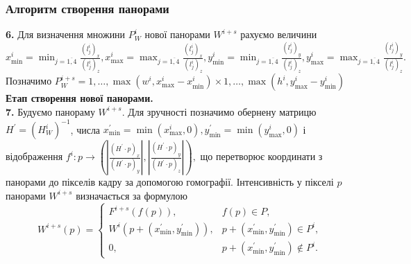 \begin{frame}
	\frametitle{Алгоритм створення панорами}
	\textbf{6.} Для визначення множини $P_{W}^{i}$ нової панорами $W^{i + s}$
	рахуємо величини
	$x_{\min}^{i}= \min_{j = \overline{1,4}}\frac{( l_{j}^{i})_{x}}{( l_{j}^{i})_{z}}
	, x_{\max}^{i}= \max_{j = \overline{1,4}}\frac{( l_{j}^{i})_{x}}{( l_{j}^{i})_{z}}
	, y_{\min}^{i}= \min_{j = \overline{1,4}}\frac{( l_{j}^{i})_{y}}{( l_{j}^{i})_{z}}
	, y_{\max}^{i}= \max_{j = \overline{1,4}}\frac{( l_{j}^{i})_{y}}{( l_{j}^{i})_{z}}
	.$
	\\ Позначимо
	$P_{W}^{i + s}={ 1,\ldots,\max( w^{i},x_{\max}^{i} - x_{\min}^{i} ) }\times{ 1,\ldots,\max( h^{i},y_{\max}^{i} - y_{\min}^{i} ) }$
	\\ \textbf{Етап створення нової панорами.} \\ \textbf{7.} Будуємо панораму
	$W^{i+s}$. Для зручності позначимо обернену матрицю $H^{'}= (H_{W}^{i})^{-1}$,
	числа
	$x_{\min}^{'}= \min(x_{\max}^{i}, 0), y_{\min}^{'}= \min(y_{\max}^{i}, 0)$ і
	відображення
	$f^{i}: p \rightarrow \left( \left| \frac{(H^{'}\cdot p)_{x}}{(H^{'}\cdot p)_{y}}
	\right|, \left| \frac{(H^{'}\cdot p)_{y}}{(H^{'}\cdot p)_{z}}\right| \right),$
	що перетворює координати з панорами до пікселів кадру за допомогою гомографії.
	Інтенсивність у пікселі $p$ панорами $W^{i+s}$ визначається за формулою
	\begin{equation*}
		W^{i + s}(p) =
		\begin{cases}
			F^{i + s}(f(p)),                           & f(p) \in P,                                    \\
			W^{i}( p + ( x_{\min}^{'},y_{\min}^{'}) ), & p + ( x_{\min}^{'},y_{\min}^{'}) \in P^{i},    \\
			0,                                         & p + ( x_{\min}^{'},y_{\min}^{'}) \notin P^{i}.
		\end{cases}
	\end{equation*}
\end{frame}